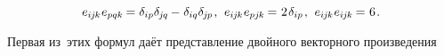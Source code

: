 \begin{otherlanguage}{russian}
\nopagebreak\vspace{-0.3em}\begin{equation}\label{veblencontraction}
e_{i\hspace{-0.1ex}j\hspace{-0.1ex}k} \hspace{.1ex} e_{pqk} \hspace{-0.16ex} = \delta_{ip} \delta_{\hspace{-0.1ex}j\hspace{-0.1ex}q} \hspace{-0.1ex} - \hspace{.1ex} \delta_{iq} \delta_{\hspace{-0.1ex}j\hspace{-0.1ex}p}
\hspace{.2ex} ,
\:\,
%
e_{i\hspace{-0.1ex}j\hspace{-0.1ex}k} \hspace{.1ex} e_{pj\hspace{-0.1ex}k} \hspace{-0.15ex} = \hspace{.1ex} 2 \hspace{.2ex} \delta_{ip}
\hspace{.2ex} ,
\:\,
%
e_{i\hspace{-0.1ex}j\hspace{-0.1ex}k} \hspace{.1ex} e_{i\hspace{-0.1ex}j\hspace{-0.1ex}k} \hspace{-0.15ex} = \hspace{.1ex} 6
\hspace{.2ex} .
\end{equation}

Первая из~этих формул даёт представление двойного векторного произведения


\end{otherlanguage}
